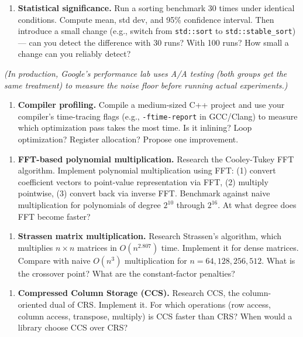 \begin{enumerate}
\item \textbf{Statistical significance.} Run a sorting benchmark 30 times under identical conditions. Compute mean, std dev, and 95\% confidence interval. Then introduce a small change (e.g., switch from \texttt{std::sort} to \texttt{std::stable\_sort}) — can you detect the difference with 30 runs? With 100 runs? How small a change can you reliably detect?
\end{enumerate}

    \textit{(In production, Google's performance lab uses A/A testing (both groups get the same treatment) to measure the noise floor before running actual experiments.)}

\begin{enumerate}
\item \textbf{Compiler profiling.} Compile a medium-sized C++ project and use your compiler's time-tracing flags (e.g., \texttt{-ftime-report} in GCC/Clang) to measure which optimization pass takes the most time. Is it inlining? Loop optimization? Register allocation? Propose one improvement.
\end{enumerate}

\begin{enumerate}
\item \textbf{FFT-based polynomial multiplication.} Research the Cooley-Tukey FFT algorithm. Implement polynomial multiplication using FFT: (1) convert coefficient vectors to point-value representation via FFT, (2) multiply pointwise, (3) convert back via inverse FFT. Benchmark against naive multiplication for polynomials of degree $2^{10}$ through $2^{16}$. At what degree does FFT become faster?
\end{enumerate}

\begin{enumerate}
\item \textbf{Strassen matrix multiplication.} Research Strassen's algorithm, which multiplies $n \times n$ matrices in $O(n^{2.807})$ time. Implement it for dense matrices. Compare with naive $O(n^{3})$ multiplication for $n = 64, 128, 256, 512$. What is the crossover point? What are the constant-factor penalties?
\end{enumerate}

\begin{enumerate}
\item \textbf{Compressed Column Storage (CCS).} Research CCS, the column-oriented dual of CRS. Implement it. For which operations (row access, column access, transpose, multiply) is CCS faster than CRS? When would a library choose CCS over CRS?
\end{enumerate}

